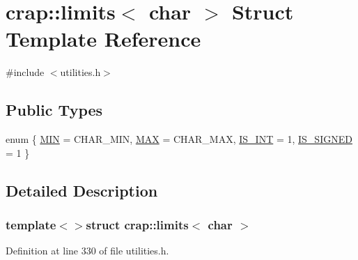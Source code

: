 \hypertarget{structcrap_1_1limits_3_01char_01_4}{}\section{crap\+:\+:limits$<$ char $>$ Struct Template Reference}
\label{structcrap_1_1limits_3_01char_01_4}


{\ttfamily \#include $<$utilities.\+h$>$}

\subsection*{Public Types}
\begin{DoxyCompactItemize}
\item 
enum \{ \hyperlink{structcrap_1_1limits_3_01char_01_4_ac4e414f38522055fb85f898b32554f48a6f881f6c22400e8345d0ddb03e97b986}{M\+I\+N} = C\+H\+A\+R\+\_\+\+M\+I\+N, 
\hyperlink{structcrap_1_1limits_3_01char_01_4_ac4e414f38522055fb85f898b32554f48acf7c4799d0f0d9ac15715d2a006d92d3}{M\+A\+X} = C\+H\+A\+R\+\_\+\+M\+A\+X, 
\hyperlink{structcrap_1_1limits_3_01char_01_4_ac4e414f38522055fb85f898b32554f48afeb7edc497fa8bc9ba26ff3f0c0083b1}{I\+S\+\_\+\+I\+N\+T} = 1, 
\hyperlink{structcrap_1_1limits_3_01char_01_4_ac4e414f38522055fb85f898b32554f48a8a3133501bca3b7b3bade69e4af680cc}{I\+S\+\_\+\+S\+I\+G\+N\+E\+D} = 1
 \}
\end{DoxyCompactItemize}


\subsection{Detailed Description}
\subsubsection*{template$<$$>$struct crap\+::limits$<$ char $>$}



Definition at line 330 of file utilities.\+h.



